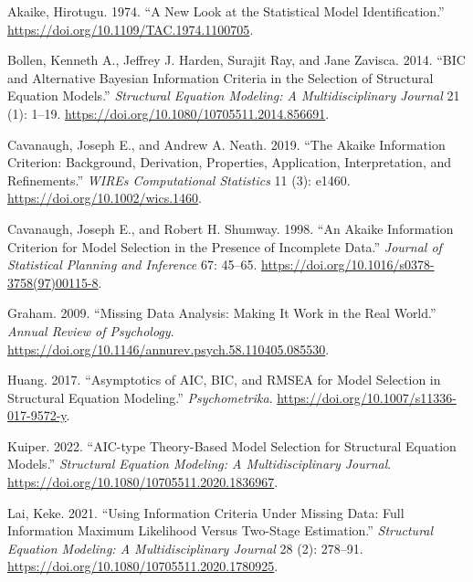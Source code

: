 \documentclass[
]{article}
\newlength{\cslhangindent}
\newenvironment{CSLReferences}[2] %
 {\begin{list}{}{%
  \setlength{\itemindent}{0pt}
  \setlength{\leftmargin}{0pt}
  \setlength{\parsep}{0pt}
  \ifodd #1
   \setlength{\leftmargin}{\cslhangindent}
   \setlength{\itemindent}{-1\cslhangindent}
  \fi
  \setlength{\itemsep}{#2\baselineskip}}}
 {\end{list}}
\begin{document}
\label{refs}
\begin{CSLReferences}{1}{0}
Akaike, Hirotugu. 1974. {``A {New Look} at the {Statistical Model
Identification}.''} \url{https://doi.org/10.1109/TAC.1974.1100705}.

Bollen, Kenneth A., Jeffrey J. Harden, Surajit Ray, and Jane Zavisca.
2014. {``{BIC} and {Alternative Bayesian Information Criteria} in the
{Selection} of {Structural Equation Models}.''} \emph{Structural
Equation Modeling: A Multidisciplinary Journal} 21 (1): 1--19.
\url{https://doi.org/10.1080/10705511.2014.856691}.

Cavanaugh, Joseph E., and Andrew A. Neath. 2019. {``The {Akaike}
Information Criterion: {Background}, Derivation, Properties,
Application, Interpretation, and Refinements.''} \emph{WIREs
Computational Statistics} 11 (3): e1460.
\url{https://doi.org/10.1002/wics.1460}.

Cavanaugh, Joseph E., and Robert H. Shumway. 1998. {``An {Akaike}
Information Criterion for Model Selection in the Presence of Incomplete
Data.''} \emph{Journal of Statistical Planning and Inference} 67:
45--65. \url{https://doi.org/10.1016/s0378-3758(97)00115-8}.

Graham. 2009. {``Missing {Data Analysis}: {Making It Work} in the {Real
World}.''} \emph{Annual Review of Psychology}.
\url{https://doi.org/10.1146/annurev.psych.58.110405.085530}.

Huang. 2017. {``Asymptotics of {AIC}, {BIC}, and {RMSEA} for {Model
Selection} in {Structural Equation Modeling}.''} \emph{Psychometrika}.
\url{https://doi.org/10.1007/s11336-017-9572-y}.

Kuiper. 2022. {``{AIC-type Theory-Based Model Selection} for {Structural
Equation Models}.''} \emph{Structural Equation Modeling: A
Multidisciplinary Journal}.
\url{https://doi.org/10.1080/10705511.2020.1836967}.

Lai, Keke. 2021. {``Using {Information Criteria Under Missing Data}:
{Full Information Maximum Likelihood Versus Two-Stage Estimation}.''}
\emph{Structural Equation Modeling: A Multidisciplinary Journal} 28 (2):
278--91. \url{https://doi.org/10.1080/10705511.2020.1780925}.


\end{CSLReferences}
\end{document}
